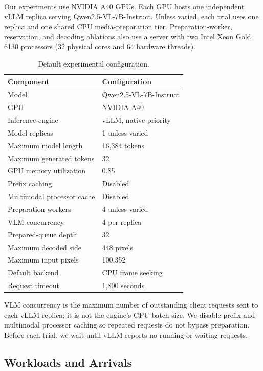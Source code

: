 \documentclass[sigconf,review,anonymous]{acmart}
\begin{document}
Our experiments use NVIDIA A40 GPUs. Each GPU hosts one independent vLLM
replica serving Qwen2.5-VL-7B-Instruct. Unless varied, each trial uses one
replica and one shared CPU media-preparation tier. Preparation-worker,
reservation, and decoding ablations also use a server with two Intel Xeon Gold
6130 processors (32 physical cores and 64 hardware threads).

\begin{table}[t]
    \centering
    \small
    \caption{Default experimental configuration.}
    \label{tab:default-config}
    \begin{tabular}{ll}
        \toprule
        Component & Configuration \\
        \midrule
        Model & Qwen2.5-VL-7B-Instruct \\
        GPU & NVIDIA A40 \\
        Inference engine & vLLM, native priority \\
        Model replicas & 1 unless varied \\
        Maximum model length & 16,384 tokens \\
        Maximum generated tokens & 32 \\
        GPU memory utilization & 0.85 \\
        Prefix caching & Disabled \\
        Multimodal processor cache & Disabled \\
        Preparation workers & 4 unless varied \\
        VLM concurrency & 4 per replica \\
        Prepared-queue depth & 32 \\
        Maximum decoded side & 448 pixels \\
        Maximum input pixels & 100,352 \\
        Default backend & CPU frame seeking \\
        Request timeout & 1,800 seconds \\
        \bottomrule
    \end{tabular}
\end{table}

VLM concurrency is the maximum number of outstanding client requests sent to
each vLLM replica; it is not the engine's GPU batch size. We disable prefix and
multimodal processor caching so repeated requests do not bypass preparation.
Before each trial, we wait until vLLM reports no running or waiting requests.

\subsection{Workloads and Arrivals}
\end{document}
